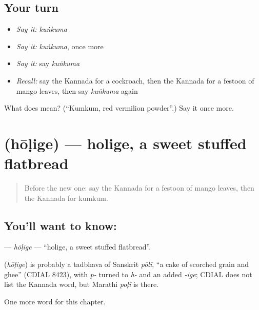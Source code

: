 \subsection*{Your turn}
\begin{itemize}
\raggedright
  \item \emph{Say it:} \emph{kuṅkuma}
  \item \emph{Say it:} \emph{kuṅkuma}, once more
  \item \emph{Say it:} say \emph{kuṅkuma}
  \item \emph{Recall:} say the Kannada for a cockroach, then the Kannada for a festoon of mango leaves, then say \emph{kuṅkuma} again
\end{itemize}

\begin{tcolorbox}[breakable,colback=teal!4,colframe=teal!35!black,title={Before you move on}]
What does  mean? (\textquotedblleft{}Kumkum, red vermilion powder\textquotedblright{}.) Say it once more.
\end{tcolorbox}
\section[\texorpdfstring{\kn{ಹೋಳಿಗೆ} (hōḷige)}{ಹೋಳಿಗೆ (hōḷige)}]{ (hōḷige) — holige, a sweet stuffed flatbread}

\label{lesson:KA-C262-holige}



\begin{quote}
Before the new one: say the Kannada for a festoon of mango leaves, then the Kannada for kumkum.
\end{quote}

\subsection*{You'll want to know: }
\textbf{} — \emph{hōḷige} — \textquotedblleft{}holige, a sweet stuffed flatbread\textquotedblright{}.

\begin{cousinweb}
\textbf{} (\emph{hōḷige}) is probably a tadbhava of Sanskrit \emph{pōlī}, \textquotedblleft{}a cake of scorched grain and ghee\textquotedblright{} (CDIAL 8423), with \emph{p-} turned to \emph{h-} and an added \emph{-ige}; CDIAL does not list the Kannada word, but Marathi \emph{poḷī} is there.
\end{cousinweb}

\begin{grammarlens}[title={What you've built}]
One more word for this chapter.
\end{grammarlens}

